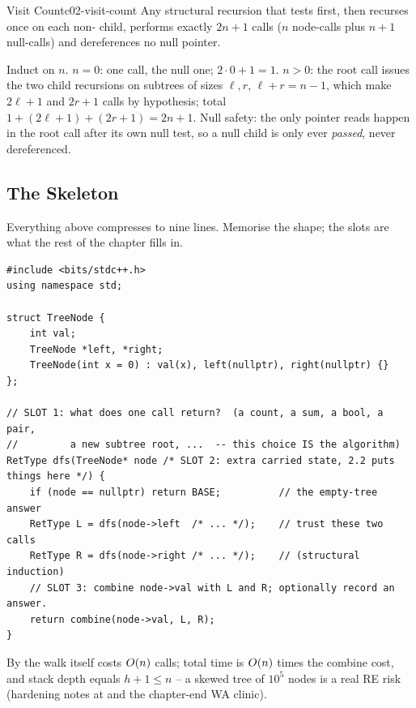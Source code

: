 \begin{lemma}{Visit Count}{c02-visit-count}
Any structural recursion that tests  first, then recurses
once on each non-\nil{} child, performs exactly $2n+1$ calls ($n$ node-calls plus
$n+1$ null-calls) and dereferences no null pointer.
\end{lemma}
\begin{proofbox}
Induct on $n$. $n=0$: one call, the null one; $2\cdot 0 + 1 = 1$. $n>0$: the root
call issues the two child recursions on subtrees of sizes $\ell, r$,
$\ell+r = n-1$, which make $2\ell+1$ and $2r+1$ calls by hypothesis; total
$1 + (2\ell+1) + (2r+1) = 2n+1$. Null safety: the only pointer reads happen in the
root call after its own null test, so a null child is only ever \emph{passed},
never dereferenced.
\end{proofbox}

\subsection{The Skeleton}

Everything above compresses to nine lines. Memorise the shape; the slots are what
the rest of the chapter fills in.

\begin{lstlisting}[caption={The universal structural-recursion skeleton; the three slots are filled per problem}, label={lst:c02-skeleton}]
#include <bits/stdc++.h>
using namespace std;

struct TreeNode {
    int val;
    TreeNode *left, *right;
    TreeNode(int x = 0) : val(x), left(nullptr), right(nullptr) {}
};

// SLOT 1: what does one call return?  (a count, a sum, a bool, a pair,
//         a new subtree root, ...  -- this choice IS the algorithm)
RetType dfs(TreeNode* node /* SLOT 2: extra carried state, 2.2 puts things here */) {
    if (node == nullptr) return BASE;          // the empty-tree answer
    RetType L = dfs(node->left  /* ... */);    // trust these two calls
    RetType R = dfs(node->right /* ... */);    // (structural induction)
    // SLOT 3: combine node->val with L and R; optionally record an answer.
    return combine(node->val, L, R);
}
\end{lstlisting}

\begin{complexitybox}
By  the walk itself costs $O(n)$ calls; total time is
$O(n)$ times the combine cost, and stack depth equals $h+1 \le n$ --
a skewed tree of $10^{5}$ nodes is a real \textsf{RE} risk (hardening notes at
 and the chapter-end WA clinic).
\end{complexitybox}

